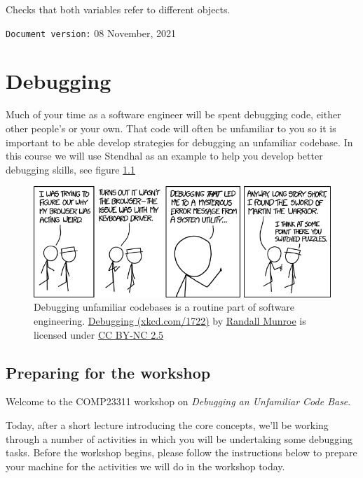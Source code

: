 \documentclass[
]{book}
\begin{document}
Checks that both variables refer to different objects.

\texttt{Document\ version:} 08 November, 2021

\hypertarget{debugging}{%
\chapter{Debugging}\label{debugging}}

Much of your time as a software engineer will be spent debugging code, either other people's or your own. That code will often be unfamiliar to you so it is important to be able develop strategies for debugging an unfamiliar codebase. In this course we will use Stendhal as an example to help you develop better debugging skills, see figure \ref{fig:xkcd-debugging-fig}

\begin{figure}

{\centering \includegraphics[width=0.99\linewidth]{images/debugging} 

}

\caption{Debugging unfamiliar codebases is a routine part of software engineering. \href{https://xkcd.com/1722/}{Debugging (xkcd.com/1722)} by \href{https://en.wikipedia.org/wiki/Randall_Munroe}{Randall Munroe} is licensed under \href{https://creativecommons.org/licenses/by-nc/2.5/}{CC BY-NC 2.5}}\label{fig:xkcd-debugging-fig}
\end{figure}



\hypertarget{preparing-for-the-workshop}{%
\section{Preparing for the workshop}\label{preparing-for-the-workshop}}

Welcome to the COMP23311 workshop on \emph{Debugging an Unfamiliar Code Base}.

Today, after a short lecture introducing the core concepts, we'll be working through a number of activities in which you will be undertaking some debugging tasks. Before the workshop begins, please follow the instructions below to prepare your machine for the activities we will do in the workshop today.
\end{document}
